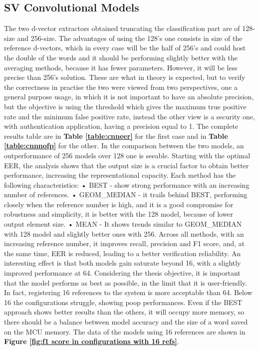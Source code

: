\subsection{SV Convolutional Models}
\label{subsec:sv convolutional models}
The two d-vector extractors obtained truncating the classification part are of 128-size and 256-size. The advantages of using the 128's one consists in size of the reference d-vectors, which in every case will be the half of 256's and could host the double of the words and it should be performing slightly better with the averaging methods, because it has fewer parameters. However, it will be less precise than 256's solution. These are what in theory is expected, but to verify the correctness in practise the two were viewed from two perspectives, one a general purpose usage, in which it is not important to have an absolute precision, but the objective is using the threshold which gives the maximum true positive rate and the minimum false positive rate, instead the other view is a security one, with authentication application, having a precision equal to 1. The complete results table are in \textbf{Table \ref{table:cnneer}} for the first case and in \textbf{Table \ref{table:cnnnofp}} for the other. In the comparison between the two models, an outperformance of 256 models over 128 one is seeable. Starting with the optimal EER, the analysis shows that the output size is a crucial factor to obtain better performance, increasing the representational capacity. Each method has the following characteristics:\newline
• BEST - show strong performance with an increasing number of references.\newline
• GEOM\_MEDIAN - it trails behind BEST, performing closely when the reference number is high, and it is a good compromise for robustness and simplicity, it is better with the 128 model, because of lower output element size.\newline
• MEAN - It shows trends similar to GEOM\_MEDIAN with 128 model and slightly better ones with 256.\newline
Across all methods, with an increasing reference number, it improves recall, precision and F1 score, and, at the same time, EER is reduced, leading to a better verification reliability. An interesting effect is that both models gain saturate beyond 16, with a slightly improved performance at 64. Considering the thesis objective, it is important that the model performs as best as possible, in the limit that it is user-friendly. In fact, registering 16 references to the system is more acceptable than 64. Below 16 the configurations struggle, showing poop performances. Even if the BEST approach shows better results than the others, it will occupy more memory, so there should be a balance between model accuracy and the size of a word saved on the MCU memory. The data of the models using 16 references are shown in \textbf{Figure \ref{fig:f1 score in configurations with 16 refs}}. 

